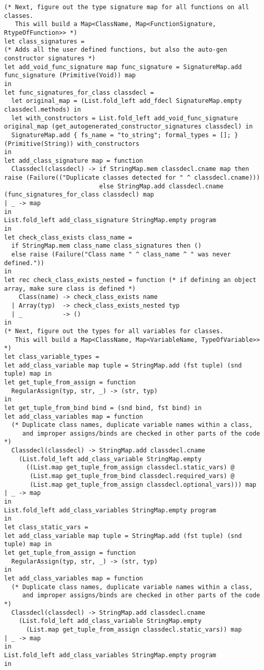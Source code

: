 \documentclass{article}
\begin{document}
\begin{verbatim}
(* Next, figure out the type signature map for all functions on all classes.
   This will build a Map<ClassName, Map<FunctionSignature, RtypeOfFunction>> *)
let class_signatures =
(* Adds all the user defined functions, but also the auto-gen constructor signatures *)
let add_void_func_signature map func_signature = SignatureMap.add func_signature (Primitive(Void)) map
in
let func_signatures_for_class classdecl =
  let original_map = (List.fold_left add_fdecl SignatureMap.empty classdecl.methods) in
  let with_constructors = List.fold_left add_void_func_signature original_map (get_autogenerated_constructor_signatures classdecl) in
  SignatureMap.add { fs_name = "to_string"; formal_types = []; } (Primitive(String)) with_constructors
in
let add_class_signature map = function
  Classdecl(classdecl) -> if StringMap.mem classdecl.cname map then raise (Failure(("Duplicate classes detected for " ^ classdecl.cname)))
                          else StringMap.add classdecl.cname (func_signatures_for_class classdecl) map
| _ -> map
in
List.fold_left add_class_signature StringMap.empty program
in
let check_class_exists class_name =
  if StringMap.mem class_name class_signatures then ()
  else raise (Failure("Class name " ^ class_name ^ " was never defined."))
in
let rec check_class_exists_nested = function (* if defining an object array, make sure class is defined *)
    Class(name) -> check_class_exists name
  | Array(typ)  -> check_class_exists_nested typ
  | _           -> ()
in
(* Next, figure out the types for all variables for classes.
   This will build a Map<ClassName, Map<VariableName, TypeOfVariable>> *)
let class_variable_types =
let add_class_variable map tuple = StringMap.add (fst tuple) (snd tuple) map in
let get_tuple_from_assign = function
  RegularAssign(typ, str, _) -> (str, typ)
in
let get_tuple_from_bind bind = (snd bind, fst bind) in
let add_class_variables map = function
  (* Duplicate class names, duplicate variable names within a class,
     and improper assigns/binds are checked in other parts of the code *)
  Classdecl(classdecl) -> StringMap.add classdecl.cname
    (List.fold_left add_class_variable StringMap.empty
      ((List.map get_tuple_from_assign classdecl.static_vars) @
       (List.map get_tuple_from_bind classdecl.required_vars) @
       (List.map get_tuple_from_assign classdecl.optional_vars))) map
| _ -> map
in
List.fold_left add_class_variables StringMap.empty program
in
let class_static_vars =
let add_class_variable map tuple = StringMap.add (fst tuple) (snd tuple) map in
let get_tuple_from_assign = function
  RegularAssign(typ, str, _) -> (str, typ)
in
let add_class_variables map = function
  (* Duplicate class names, duplicate variable names within a class,
     and improper assigns/binds are checked in other parts of the code *)
  Classdecl(classdecl) -> StringMap.add classdecl.cname
    (List.fold_left add_class_variable StringMap.empty
      (List.map get_tuple_from_assign classdecl.static_vars)) map
| _ -> map
in
List.fold_left add_class_variables StringMap.empty program
in


\end{verbatim}
\end{document}
